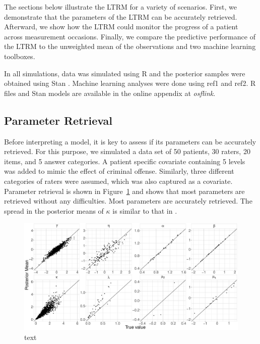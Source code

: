 \documentclass{article}
\newcommand{\DON}[1] {\todo[inline, color=white]{Don: {#1}}}
\newcommand{\osflink}{\textit{osflink}}
\begin{document}
The sections below illustrate the LTRM for a variety of scenarios. First, we demonstrate that the parameters of the LTRM can be accurately retrieved. Afterward, we show how the LTRM could monitor the progress of a patient across measurement occasions. Finally, we compare the predictive performance of the LTRM to the unweighted mean of the observations and two machine learning toolboxes.

In all simulations, data was simulated using R \cite{R} and the posterior samples were obtained using Stan \cite{CarpenterEtAl2017Stan}. Machine learning analyses were done using ref1 and ref2. R files and Stan models are available in the online appendix at \osflink{}.
\DON{Fill in refs.}

\subsection*{Parameter Retrieval}
Before interpreting a model, it is key to assess if its parameters can be accurately retrieved. For this purpose, we simulated a data set of 50 patients, 30 raters, 20 items, and 5 answer categories. A patient specific covariate containing 5 levels was added to mimic the effect of criminal offense. Similarly, three different categories of raters were assumed, which was also captured as a covariate. Parameter retrieval is shown in Figure~\ref{fig:parameterRecoveryM3} and shows that most parameters are retrieved without any difficulties. Most parameters are accurately retrieved. The spread in the posterior means of $\kappa$ is similar to that in .

\begin{figure}[!ht]
	\centering
	\includegraphics[width= \textwidth]{figures/parameterRecoveryModel3.pdf}
	\caption{text}
	\label{fig:parameterRecoveryM3}
\end{figure}
\end{document}
